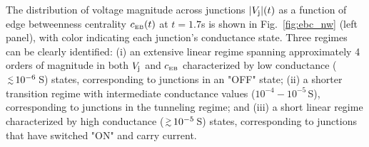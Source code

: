 \documentclass[fleqn,10pt,  reprint, amsmath,amssymb,aps, floatfix]{wlscirep}
\newcommand{\Vj}{V_{\rm j}}
\newcommand{\cEB}{c_{\scriptscriptstyle \rm EB}}
\newcommand{\gtapprox}{\raisebox{-0.5ex}{$\,\stackrel{>}{\scriptstyle \sim}\,$}}
\newcommand{\ltapprox}{\raisebox{-0.5ex}{$\,\stackrel{<}{\scriptstyle \sim}\,$}}
\begin{document}



The distribution of voltage magnitude across junctions $|\Vj|(t)$ as a function of edge betweenness centrality $\cEB (t)$ at $t = 1.7$s is shown in Fig.~\ref{fig:ebc_nw} (left panel), with color indicating each junction's conductance state. Three regimes can be clearly identified: (i) an extensive linear regime spanning approximately 4 orders of magnitude in both $\Vj$ and $\cEB$ characterized by low conductance ($\ltapprox 10^{-6}\,$S) states, corresponding to junctions in an "OFF" state; (ii) a shorter transition regime with intermediate conductance values ($10^{-4} - 10^{-5}\,$S), corresponding to junctions in the tunneling regime; and (iii) a short linear regime characterized by high conductance ($\gtapprox 10^{-5}\,$S) states, corresponding to junctions that have switched "ON" and carry current.
\end{document}
